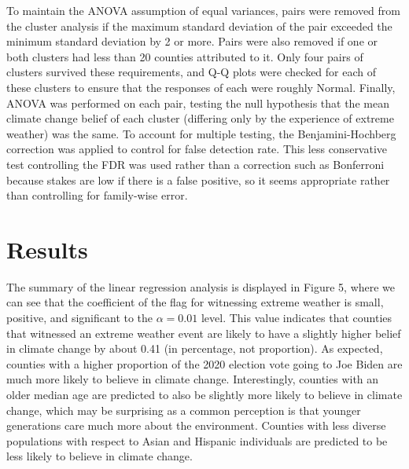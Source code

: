 \documentclass{article}
\begin{document}
To maintain the ANOVA assumption of equal variances, pairs were removed from the cluster analysis if the maximum standard deviation of the pair exceeded the minimum standard deviation by 2 or more. Pairs were also removed if one or both clusters had less than 20 counties attributed to it. Only four pairs of clusters survived these requirements, and Q-Q plots were checked for each of these clusters to ensure that the responses of each were roughly Normal. Finally, ANOVA was performed on each pair, testing the null hypothesis that the mean climate change belief of each cluster (differing only by the experience of extreme weather) was the same. To account for multiple testing, the Benjamini-Hochberg correction was applied to control for false detection rate. This less conservative test controlling the FDR was used rather than a correction such as Bonferroni because stakes are low if there is a false positive, so it seems appropriate rather than controlling for family-wise error.

\section{Results}
The summary of the linear regression analysis is displayed in Figure 5, where we can see that the coefficient of the flag for witnessing extreme weather is small, positive, and significant to the $\alpha = 0.01$ level. This value indicates that counties that witnessed an extreme weather event are likely to have a slightly higher belief in climate change by about 0.41 (in percentage, not proportion). As expected, counties with a higher proportion of the 2020 election vote going to Joe Biden are much more likely to believe in climate change. Interestingly, counties with an older median age are predicted to also be slightly more likely to believe in climate change, which may be surprising as a common perception is that younger generations care much more about the environment. Counties with less diverse populations with respect to Asian and Hispanic individuals are predicted to be less likely to believe in climate change. 
\end{document}
